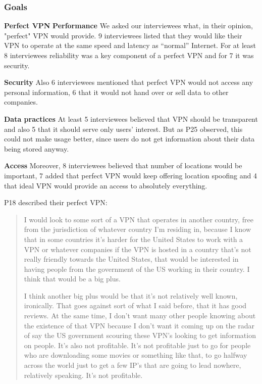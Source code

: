 \subsubsection{Goals}



\textbf{Perfect VPN} \textbf{Performance} We asked our interviewees what, in
their opinion, "perfect" VPN would provide. 9 interviewees listed that they
would like their VPN to operate at the same speed and latency as  “normal”
Internet. For at least 8 interviewees reliability was a key component of a
perfect VPN and for 7 it was security. 

\textbf{Security} Also 6 interviewees mentioned that perfect VPN would not
access any personal information, 6 that it would not hand over or sell data to
other companies. 

\textbf{Data practices} At least 5 interviewees believed that VPN should be
transparent and also 5 that it should serve only users' interest. But as P25
observed, this could not make usage better, since users do not get information
about their data being stored anyway.


\textbf{Access} Moreover, 8 interviewees believed that number of locations
would be important, 7 added that perfect VPN would keep offering location
spoofing and 4 that ideal VPN would provide an access to absolutely
everything.

P18 described their perfect VPN: \begin{quote}I would look to some sort of a
    VPN that operates in another country, free from the jurisdiction of
    whatever country I'm residing in, because I know that in some countries
    it's harder for the United States to work with a VPN or whatever companies
    if the VPN is hosted in a country that's not really friendly towards the
    United States, that would be interested in having people from the
    government of the US working in their country. I think that would be a big
    plus.


I think another big plus would be that it's not relatively well known,
ironically. That goes against sort of what I said before, that it has good
reviews. At the same time, I don't want many other people knowing about the
existence of that VPN because I don't want it coming up on the radar of say
the US government scouring these VPN's looking to get information on people.
It's also not profitable. It's not profitable just to go for people who are
downloading some movies or something like that, to go halfway across the world
just to get a few IP's that are going to lead nowhere, relatively speaking.
It's not profitable.\end{quote}


